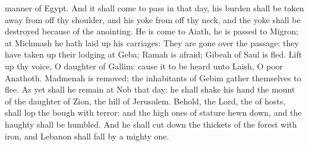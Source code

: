 {manner of
Egypt.
And it shall come to pass in that
day,
{} his
burden shall be taken
away from off thy
shoulder, and his
yoke from off thy
neck, and the
yoke shall be
destroyed
because of the
anointing.
He is
come to
Aiath, he is
passed to
Migron; at
Michmash he hath laid
up his
carriages:
They are gone
over the
passage: they have taken up their
lodging at
Geba;
Ramah is
afraid;
Gibeah of
Saul is
fled.
Lift
up thy
voice, O
daughter
of
Gallim: cause it to be
heard unto
Laish, O
poor
Anathoth.
Madmenah is
removed; the
inhabitants of
Gebim gather themselves to
flee.
As yet shall he
remain at
Nob that
day: he shall
shake his
hand
{} the
mount of the
daughter of
Zion, the
hill of
Jerusalem.
Behold, the
Lord, the
{} of
hosts, shall
lop the
bough with
terror: and the high
ones of
stature
{} hewn
down, and the
haughty shall be
humbled.
And he shall cut
down the
thickets of the
forest with
iron, and
Lebanon shall
fall by a mighty
one.

}
